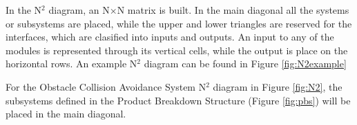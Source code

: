 In the N$^2$ diagram, an N$\times$N matrix is built.
In the main diagonal all the systems or subsystems are placed, while the upper and lower triangles are reserved for the interfaces, which are clasified into inputs and outputs.
An input to any of the modules is represented through its vertical cells, while the output is place on the horizontal rows.
An example N$^2$ diagram can be found in Figure \ref{fig:N2example}



For the Obstacle Collision Avoidance System N$^2$ diagram in Figure \ref{fig:N2}, the subsystems defined in the Product Breakdown Structure (Figure \ref{fig:pbs}) will be placed in the main diagonal.




